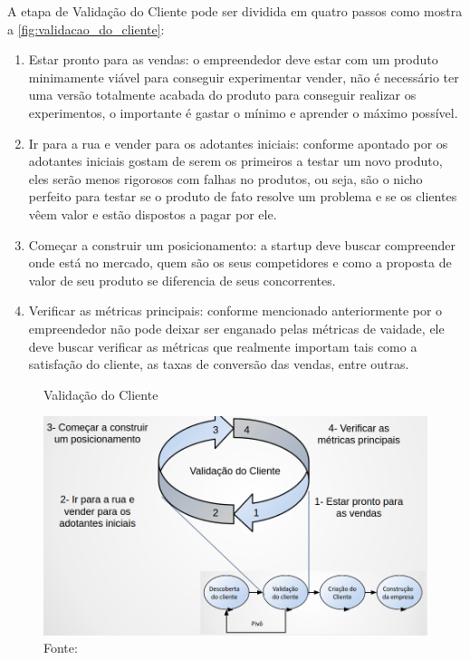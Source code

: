 A etapa de Validação do Cliente pode ser dividida em quatro passos como mostra a \autoref{fig:validacao_do_cliente}:
\begin{enumerate}
\item Estar pronto para as vendas: o empreendedor deve estar com um produto minimamente viável para conseguir experimentar vender, não é necessário ter uma versão totalmente acabada do produto para conseguir realizar os experimentos, o importante é gastar o mínimo e aprender o máximo possível.
\item Ir para a rua e vender para os adotantes iniciais: conforme apontado por  os adotantes iniciais gostam de serem os primeiros a testar um novo produto, eles serão menos rigorosos com falhas no produtos, ou seja, são o nicho perfeito para testar se o produto de fato resolve um problema e se os clientes vêem valor e estão dispostos a pagar por ele.
\item Começar a construir um posicionamento: a startup deve buscar compreender onde está no mercado, quem são os seus competidores e como a proposta de valor de seu produto se diferencia de seus concorrentes.
\item Verificar as métricas principais: conforme mencionado anteriormente por  o empreendedor não pode deixar ser enganado pelas métricas de vaidade, ele deve buscar verificar as métricas que realmente importam tais como a satisfação do cliente, as taxas de conversão das vendas, entre outras.
\end{enumerate}

\begin{figure}[H]
\caption{Validação do Cliente}
\centerline{\includegraphics[scale=0.3]{img/validacao_do_cliente}}
\label{fig:validacao_do_cliente}
\caption* {Fonte: }
\end{figure}

